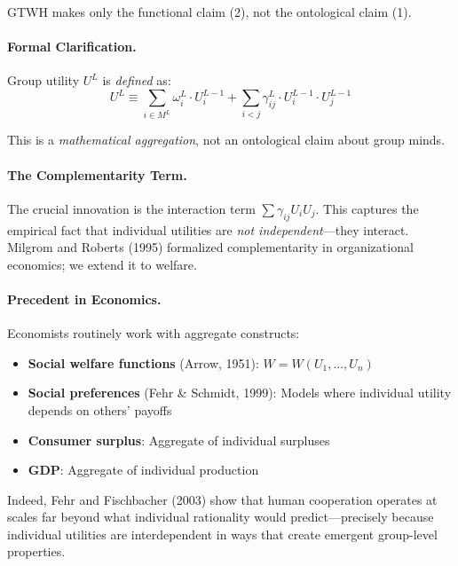 GTWH makes only the functional claim (2), not the ontological claim (1).

\paragraph{Formal Clarification.}

Group utility $U^L$ is \textit{defined} as:
\begin{equation}
U^L \equiv \sum_{i \in M^L} \omega^L_i \cdot U^{L-1}_i + \sum_{i < j} \gamma^L_{ij} \cdot U^{L-1}_i \cdot U^{L-1}_j
\end{equation}

This is a \textit{mathematical aggregation}, not an ontological claim about group minds.

\paragraph{The Complementarity Term.}

The crucial innovation is the interaction term $\sum \gamma_{ij} U_i U_j$. 
This captures the empirical fact that individual utilities are \textit{not 
independent}---they interact. Milgrom and Roberts (1995) formalized complementarity 
in organizational economics; we extend it to welfare.

\paragraph{Precedent in Economics.}

Economists routinely work with aggregate constructs:
\begin{itemize}[nosep]
\item \textbf{Social welfare functions} (Arrow, 1951): $W = W(U_1, ..., U_n)$
\item \textbf{Social preferences} (Fehr \& Schmidt, 1999): Models where individual 
utility depends on others' payoffs
\item \textbf{Consumer surplus}: Aggregate of individual surpluses
\item \textbf{GDP}: Aggregate of individual production
\end{itemize}

Indeed, Fehr and Fischbacher (2003) show that human cooperation operates at 
scales far beyond what individual rationality would predict---precisely because 
individual utilities are interdependent in ways that create emergent group-level 
properties.

